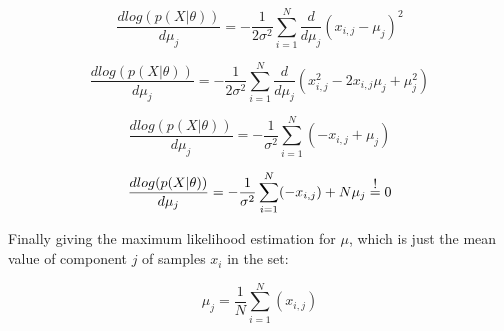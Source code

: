 $$
\frac{dlog(p(X|\theta))}{d\mu_j} = -\frac{1}{2\sigma^2}    \sum_{i=1}^{N}    \frac{d}{d\mu_j}
(x_{i,j} - \mu_{j})^2 
$$


$$
\frac{dlog(p(X|\theta))}{d\mu_j} = -\frac{1}{2\sigma^2}    \sum_{i=1}^{N}    \frac{d}{d\mu_j}
(x_{i,j}^2 - 2 x_{i,j} \mu_{j} + \mu_{j}^2 ) 
$$


$$
\frac{dlog(p(X|\theta))}{d\mu_j} = -\frac{1}{\sigma^2}    \sum_{i=1}^{N}   (- x_{i,j}  +  \mu_{j} ) 
$$




$$
\frac{dlog(p(X|\theta))}{d\mu_j} = -\frac{1}{\sigma^2}    \sum_{i=1}^{N}   (- x_{i,j})  +  N\mu_{j}  \stackrel{\normalfont\mbox{!}}{ = } 0
$$

Finally giving the maximum likelihood estimation for $\mu$, which is just the mean value of component $j$ of samples $x_i$ in the set:

$$
\mu_{j}  =   \frac{1}{N} \sum_{i=1}^{N}   (x_{i,j})
$$


